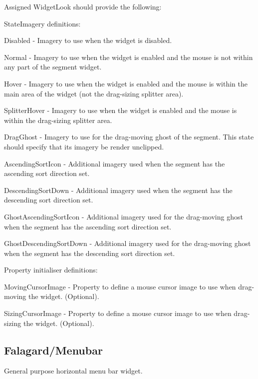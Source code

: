 Assigned Widget\+Look should provide the following\+: 
\begin{DoxyItemize}
\item State\+Imagery definitions\+: 
\begin{DoxyItemize}
\item Disabled -\/ Imagery to use when the widget is disabled. 
\item Normal -\/ Imagery to use when the widget is enabled and the mouse is not within any part of the segment widget. 
\item Hover -\/ Imagery to use when the widget is enabled and the mouse is within the main area of the widget (not the drag-\/sizing \textquotesingle{}splitter\textquotesingle{} area). 
\item Splitter\+Hover -\/ Imagery to use when the widget is enabled and the mouse is within the drag-\/sizing \textquotesingle{}splitter\textquotesingle{} area. 
\item Drag\+Ghost -\/ Imagery to use for the drag-\/moving \textquotesingle{}ghost\textquotesingle{} of the segment. This state should specify that its imagery be render unclipped. 
\item Ascending\+Sort\+Icon -\/ Additional imagery used when the segment has the ascending sort direction set. 
\item Descending\+Sort\+Down -\/ Additional imagery used when the segment has the descending sort direction set. 
\item Ghost\+Ascending\+Sort\+Icon -\/ Additional imagery used for the drag-\/moving \textquotesingle{}ghost\textquotesingle{} when the segment has the ascending sort direction set. 
\item Ghost\+Descending\+Sort\+Down -\/ Additional imagery used for the drag-\/moving \textquotesingle{}ghost\textquotesingle{} when the segment has the descending sort direction set. 
\end{DoxyItemize}


\item Property initialiser definitions\+: 
\begin{DoxyItemize}
\item Moving\+Cursor\+Image -\/ Property to define a mouse cursor image to use when drag-\/moving the widget. (Optional). 
\item Sizing\+Cursor\+Image -\/ Property to define a mouse cursor image to use when drag-\/sizing the widget. (Optional). 
\end{DoxyItemize}
\end{DoxyItemize}\hypertarget{fal_wr_ref_fal_wr_ref_sec_10}{}\subsection{Falagard/\+Menubar}\label{fal_wr_ref_fal_wr_ref_sec_10}
General purpose horizontal menu bar widget.

